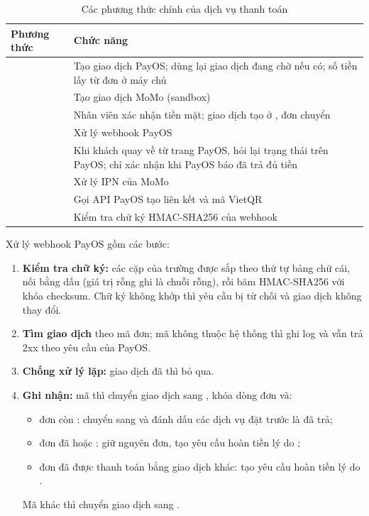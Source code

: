 \begin{table}[!htbp]
\centering
\small
\caption{Các phương thức chính của dịch vụ thanh toán}
\label{tab:spec-payment-service}
\renewcommand{\arraystretch}{1.2}
\begin{tabularx}{\linewidth}{|P{5.2cm}|L|}
\hline
\textbf{Phương thức} & \textbf{Chức năng} \\
\hline
{} & Tạo giao dịch PayOS; dùng lại giao dịch đang chờ nếu có; số tiền lấy từ đơn ở máy chủ \\
\hline
{} & Tạo giao dịch MoMo (sandbox) \\
\hline
{} & Nhân viên xác nhận tiền mặt; giao dịch tạo ở , đơn chuyển  \\
\hline
{} & Xử lý webhook PayOS \\
\hline
{} & Khi khách quay về từ trang PayOS, hỏi lại trạng thái trên PayOS; chỉ xác nhận khi PayOS báo đã trả đủ tiền \\
\hline
{} & Xử lý IPN của MoMo \\
\hline
{} & Gọi API PayOS tạo liên kết và mã VietQR \\
\hline
{} & Kiểm tra chữ ký HMAC-SHA256 của webhook \\
\hline
\end{tabularx}
\end{table}

Xử lý webhook PayOS gồm các bước:
\begin{enumerate}
    \item \textbf{Kiểm tra chữ ký:} các cặp  của trường  được sắp theo thứ tự bảng chữ cái, nối bằng dấu \mt{\&} (giá trị rỗng ghi là chuỗi rỗng), rồi băm HMAC-SHA256 với khóa checksum. Chữ ký không khớp thì yêu cầu bị từ chối và giao dịch không thay đổi.
    \item \textbf{Tìm giao dịch} theo mã đơn; mã không thuộc hệ thống thì ghi log và vẫn trả 2xx theo yêu cầu của PayOS.
    \item \textbf{Chống xử lý lặp:} giao dịch đã  thì bỏ qua.
    \item \textbf{Ghi nhận:} mã  thì chuyển giao dịch sang , khóa dòng đơn và:
    \begin{itemize}
        \item đơn còn : chuyển sang  và đánh dấu các dịch vụ đặt trước là đã trả;
        \item đơn đã  hoặc : giữ nguyên đơn, tạo yêu cầu hoàn tiền lý do ;
        \item đơn đã được thanh toán bằng giao dịch khác: tạo yêu cầu hoàn tiền lý do .
    \end{itemize}
    Mã khác  thì chuyển giao dịch sang .
\end{enumerate}

